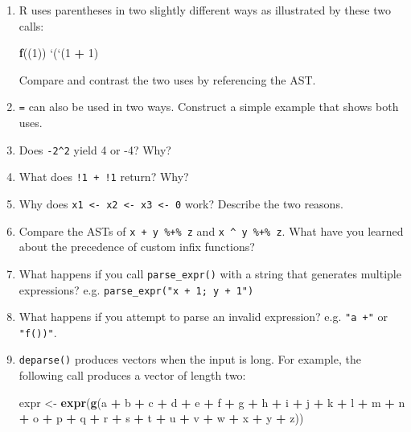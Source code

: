 \documentclass[]{book}
\newenvironment{Shaded}{\begin{snugshade}}{\end{snugshade}}
\newcommand{\DataTypeTok}[1]{\textcolor[rgb]{0.27,0.27,0.27}{#1}}
\newcommand{\DecValTok}[1]{\textcolor[rgb]{0.06,0.06,0.06}{#1}}
\newcommand{\KeywordTok}[1]{\textcolor[rgb]{0.27,0.27,0.27}{\textbf{#1}}}
\newcommand{\NormalTok}[1]{#1}
\newcommand{\OperatorTok}[1]{\textcolor[rgb]{0.43,0.43,0.43}{\textbf{#1}}}
\newcommand{\StringTok}[1]{\textcolor[rgb]{0.5,0.5,0.5}{#1}}
\begin{document}
\begin{enumerate}
\def\labelenumi{\arabic{enumi}.}
\item
  R uses parentheses in two slightly different ways as illustrated by
  these two calls:

\begin{Shaded}
\begin{Highlighting}[]
\KeywordTok{f}\NormalTok{((}\DecValTok{1}\NormalTok{))}
\StringTok{`}\DataTypeTok{(}\StringTok{`}\NormalTok{(}\DecValTok{1} \OperatorTok{+}\StringTok{ }\DecValTok{1}\NormalTok{)}
\end{Highlighting}
\end{Shaded}

  Compare and contrast the two uses by referencing the AST.
\item
  \texttt{=} can also be used in two ways. Construct a simple example that shows
  both uses.
\item
  Does \texttt{-2\^{}2} yield 4 or -4? Why?
\item
  What does \texttt{!1\ +\ !1} return? Why?
\item
  Why does \texttt{x1\ \textless{}-\ x2\ \textless{}-\ x3\ \textless{}-\ 0} work? Describe the two reasons.
\item
  Compare the ASTs of \texttt{x\ +\ y\ \%+\%\ z} and \texttt{x\ \^{}\ y\ \%+\%\ z}. What have you learned
  about the precedence of custom infix functions?
\item
  What happens if you call \texttt{parse\_expr()} with a string that generates
  multiple expressions? e.g. \texttt{parse\_expr("x\ +\ 1;\ y\ +\ 1")}
\item
  What happens if you attempt to parse an invalid expression? e.g. \texttt{"a\ +"}
  or \texttt{"f())"}.
\item
  \texttt{deparse()} produces vectors when the input is long. For example, the
  following call produces a vector of length two:

\begin{Shaded}
\begin{Highlighting}[]
\NormalTok{expr <-}\StringTok{ }\KeywordTok{expr}\NormalTok{(}\KeywordTok{g}\NormalTok{(a }\OperatorTok{+}\StringTok{ }\NormalTok{b }\OperatorTok{+}\StringTok{ }\NormalTok{c }\OperatorTok{+}\StringTok{ }\NormalTok{d }\OperatorTok{+}\StringTok{ }\NormalTok{e }\OperatorTok{+}\StringTok{ }\NormalTok{f }\OperatorTok{+}\StringTok{ }\NormalTok{g }\OperatorTok{+}\StringTok{ }\NormalTok{h }\OperatorTok{+}\StringTok{ }\NormalTok{i }\OperatorTok{+}\StringTok{ }\NormalTok{j }\OperatorTok{+}\StringTok{ }\NormalTok{k }\OperatorTok{+}\StringTok{ }\NormalTok{l }\OperatorTok{+}\StringTok{ }
\StringTok{  }\NormalTok{m }\OperatorTok{+}\StringTok{ }\NormalTok{n }\OperatorTok{+}\StringTok{ }\NormalTok{o }\OperatorTok{+}\StringTok{ }\NormalTok{p }\OperatorTok{+}\StringTok{ }\NormalTok{q }\OperatorTok{+}\StringTok{ }\NormalTok{r }\OperatorTok{+}\StringTok{ }\NormalTok{s }\OperatorTok{+}\StringTok{ }\NormalTok{t }\OperatorTok{+}\StringTok{ }\NormalTok{u }\OperatorTok{+}\StringTok{ }\NormalTok{v }\OperatorTok{+}\StringTok{ }\NormalTok{w }\OperatorTok{+}\StringTok{ }\NormalTok{x }\OperatorTok{+}\StringTok{ }\NormalTok{y }\OperatorTok{+}\StringTok{ }\NormalTok{z))}


\end{Highlighting}
\end{Shaded}
\end{enumerate}
\end{document}
